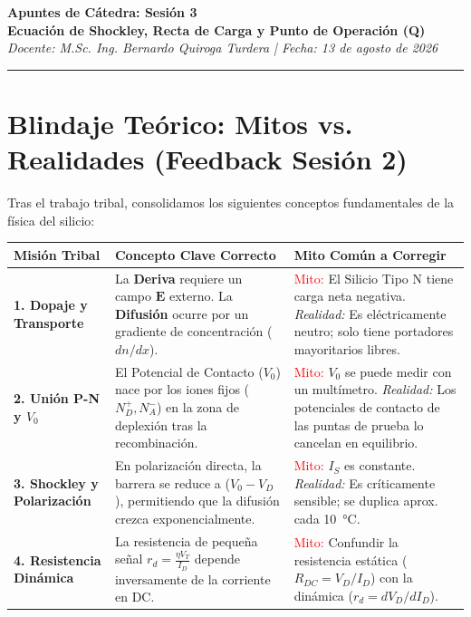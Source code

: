 \documentclass[11pt, a4paper]{article}
\begin{document}
\begin{center}
    {\LARGE \textbf{Apuntes de Cátedra: Sesión 3}}\\[0.3cm]
    {\large \textbf{Ecuación de Shockley, Recta de Carga y Punto de Operación (Q)}}\\
    \textit{Docente: M.Sc. Ing. Bernardo Quiroga Turdera \quad | \quad Fecha: 13 de agosto de 2026}
    \vspace{0.3cm}
    \hrule
\end{center}

\vspace{0.3cm}

\section{Blindaje Teórico: Mitos vs. Realidades (Feedback Sesión 2)}
Tras el trabajo tribal, consolidamos los siguientes conceptos fundamentales de la física del silicio:

\begin{center}
\renewcommand{\arraystretch}{1.5}
\begin{tabularx}{\textwidth}{@{} >{\bfseries}p{3.5cm} X X @{}}
\toprule
Misión Tribal & Concepto Clave Correcto & Mito Común a Corregir \\
\midrule
1. Dopaje y Transporte & 
La \textbf{Deriva} requiere un campo $\mathbf{E}$ externo. La \textbf{Difusión} ocurre por un gradiente de concentración ($dn/dx$). & 
\textcolor{red}{Mito:} El Silicio Tipo N tiene carga neta negativa. \textit{Realidad:} Es eléctricamente neutro; solo tiene portadores mayoritarios libres.\\

2. Unión P-N y $V_0$ & 
El Potencial de Contacto ($V_0$) nace por los iones fijos ($N_D^+, N_A^-$) en la zona de deplexión tras la recombinación. & 
\textcolor{red}{Mito:} $V_0$ se puede medir con un multímetro. \textit{Realidad:} Los potenciales de contacto de las puntas de prueba lo cancelan en equilibrio.\\

3. Shockley y Polarización & 
En polarización directa, la barrera se reduce a ($V_0 - V_D$), permitiendo que la difusión crezca exponencialmente. & 
\textcolor{red}{Mito:} $I_S$ es constante. \textit{Realidad:} Es críticamente sensible; se duplica aprox. cada \qty{10}{\celsius}.\\

4. Resistencia Dinámica & 
La resistencia de pequeña señal $r_d = \frac{\eta V_T}{I_D}$ depende inversamente de la corriente en DC. & 
\textcolor{red}{Mito:} Confundir la resistencia estática ($R_{DC} = V_D/I_D$) con la dinámica ($r_d = dV_D/dI_D$).\\
\bottomrule
\end{tabularx}
\end{center}
\end{document}
